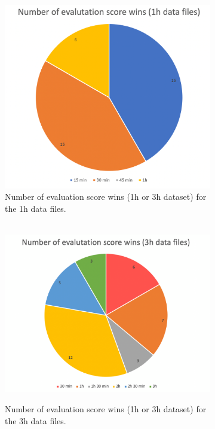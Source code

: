\begin{figure}
  \centering
  \begin{subfigure}{.475\textwidth}
    \centering
    \includegraphics[width=1\textwidth]{./images/clusteringResults/clusteringResultsGraph1h.png}
    \caption{Number of evaluation score wins (1h or 3h dataset) for the 1h data files.}
    \label{figure:clusteringResultsGraph1h}
  \end{subfigure}
  \hfill
  \begin{subfigure}{.475\textwidth}
    \centering
    \  \includegraphics[width=1.2\textwidth]{./images/clusteringResults/clusteringResultsGraph3h.png}
    \caption{Number of evaluation score wins (1h or 3h dataset) for the 3h data files.}
    \label{figure:clusteringResultsGraph3h}
  \end{subfigure}
 \caption{} 
\end{figure}

